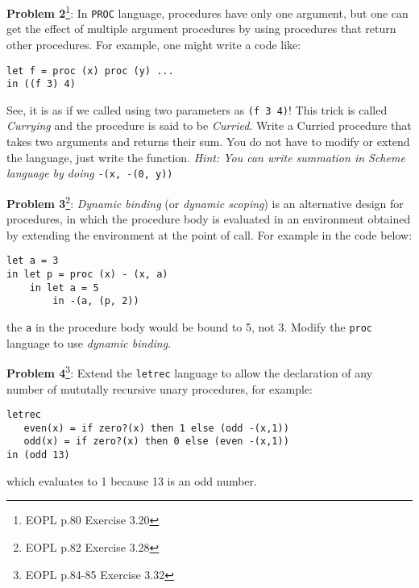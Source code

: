 \documentclass[12pt,reqno]{amsart}
\newcommand{\code}[1]{\texttt{#1}}
\begin{document}
\textbf{Problem 2}\footnote{EOPL p.80 Exercise 3.20}: In \code{PROC} language, procedures have only one argument, but one can get the effect of multiple argument procedures by using procedures that return other procedures. For example, one might write a code like:
\begin{lstlisting}
let f = proc (x) proc (y) ...
in ((f 3) 4)
\end{lstlisting}
See, it is as if we called using two parameters as \code{(f 3 4)}! This trick is called \textit{Currying} and the procedure is said to be \textit{Curried}. Write a Curried procedure that takes two arguments and returns their sum. You do not have to modify or extend the language, just write the function. \textit{Hint: You can write summation in Scheme language by doing} \code{-(x, -(0, y))}

\newpage
\thispagestyle{empty}

\textbf{Problem 3}\footnote{EOPL p.82 Exercise 3.28}: \textit{Dynamic binding} (or \textit{dynamic scoping}) is an alternative design for procedures, in which the procedure body is evaluated in an environment obtained by extending the environment at the point of call. For example in the code below:
\begin{lstlisting}
let a = 3
in let p = proc (x) - (x, a)
    in let a = 5
        in -(a, (p, 2))
\end{lstlisting}
the \code{a} in the procedure body would be bound to 5, not 3. Modify the \code{proc} language to use \textit{dynamic binding}.

\vspace{7.5mm}


\textbf{Problem 4}\footnote{EOPL p.84-85 Exercise 3.32}: Extend the \code{letrec} language to allow the declaration of any number of mututally recursive unary procedures, for example:
\begin{lstlisting}
letrec
   even(x) = if zero?(x) then 1 else (odd -(x,1))
   odd(x) = if zero?(x) then 0 else (even -(x,1))
in (odd 13)
\end{lstlisting}
which evaluates to 1 because 13 is an odd number.
\end{document}
